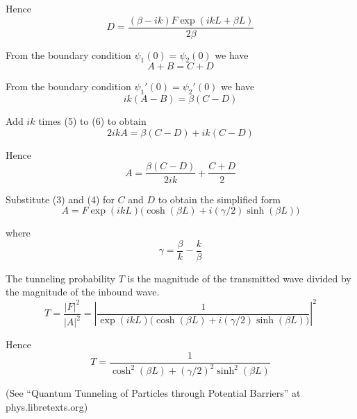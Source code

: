 Hence
\begin{equation*}
D=\frac{(\beta-ik)F\exp(ikL+\beta L)}{2\beta}
\tag{4}
\end{equation*}

From the boundary condition $\psi_1(0)=\psi_2(0)$ we have
\begin{equation*}
A+B=C+D
\tag{5}
\end{equation*}

From the boundary condition $\psi_1'(0)=\psi_2'(0)$ we have
\begin{equation*}
ik(A-B)=\beta(C-D)
\tag{6}
\end{equation*}

Add $ik$ times (5) to (6) to obtain
\begin{equation*}
2ikA=\beta(C-D)+ik(C-D)
\end{equation*}

Hence
\begin{equation*}
A=\frac{\beta(C-D)}{2ik}+\frac{C+D}{2}
\end{equation*}

Substitute (3) and (4) for $C$ and $D$ to obtain
the simplified form
\begin{equation*}
A = F\exp(ikL)\bigl(\cosh(\beta L)+i(\gamma/2)\sinh(\beta L)\bigr)
\tag{7}
\end{equation*}

where
\begin{equation*}
\gamma=\frac{\beta}{k}-\frac{k}{\beta}
\end{equation*}

The tunneling probability $T$ is the magnitude of the transmitted
wave divided by the magnitude of the inbound wave.
\begin{equation*}
T=\frac{|F|^2}{|A|^2}
=\left|\frac{1}{\exp(ikL)\bigl(\cosh(\beta L)+i(\gamma/2)\sinh(\beta L)\bigr)}\right|^2
\end{equation*}

Hence
\begin{equation*}
T=\frac{1}{\cosh^2(\beta L)+(\gamma/2)^2\sinh^2(\beta L)}
\tag{8}
\end{equation*}

(See ``Quantum Tunneling of Particles through Potential Barriers''
at phys.libretexts.org)


